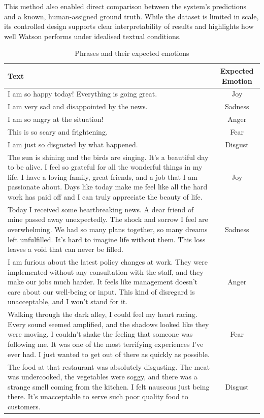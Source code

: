 This method also enabled direct comparison between the system's predictions and a known, human-assigned ground truth. While the dataset is limited in scale, its controlled design supports clear interpretability of results and highlights how well Watson performs under idealised textual conditions.

\begin{table}[h!]
\centering{}
\caption{Phrases and their expected emotions}
\begin{tabular}{|p{9cm}|c|}
\hline
\textbf{Text} & \textbf{Expected Emotion} \\ \hline
I am so happy today! Everything is going great. & Joy \\ \hline
I am very sad and disappointed by the news. & Sadness \\ \hline
I am so angry at the situation! & Anger \\ \hline
This is so scary and frightening. & Fear \\ \hline
I am just so disgusted by what happened. & Disgust \\ \hline
The sun is shining and the birds are singing. It's a beautiful day to be alive. I feel so grateful for all the wonderful things in my life. I have a loving family, great friends, and a job that I am passionate about. Days like today make me feel like all the hard work has paid off and I can truly appreciate the beauty of life. & Joy \\ \hline
Today I received some heartbreaking news. A dear friend of mine passed away unexpectedly. The shock and sorrow I feel are overwhelming. We had so many plans together, so many dreams left unfulfilled. It's hard to imagine life without them. This loss leaves a void that can never be filled. & Sadness \\ \hline
I am furious about the latest policy changes at work. They were implemented without any consultation with the staff, and they make our jobs much harder. It feels like management doesn't care about our well-being or input. This kind of disregard is unacceptable, and I won't stand for it. & Anger \\ \hline
Walking through the dark alley, I could feel my heart racing. Every sound seemed amplified, and the shadows looked like they were moving. I couldn't shake the feeling that someone was following me. It was one of the most terrifying experiences I've ever had. I just wanted to get out of there as quickly as possible. & Fear \\ \hline
The food at that restaurant was absolutely disgusting. The meat was undercooked, the vegetables were soggy, and there was a strange smell coming from the kitchen. I felt nauseous just being there. It's unacceptable to serve such poor quality food to customers. & Disgust \\ \hline
\end{tabular}
\label{tab:phrases_emotions}
\end{table}

\clearpage{}
